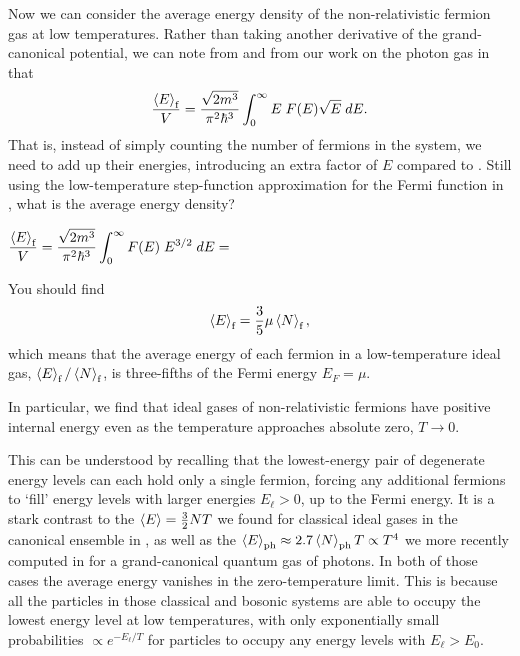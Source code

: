 Now we can consider the average energy density of the non-relativistic fermion gas at low temperatures.
Rather than taking another derivative of the grand-canonical potential, we can note from  and from our work on the photon gas in  that
\begin{equation}
  \frac{\left\langle E \right\rangle_{\text{f}}}{V} = \frac{\sqrt{2m^3}}{\pi^2 \hbar^3} \int_0^{\infty} E \; F(E) \sqrt{E} \; dE.
\end{equation}
That is, instead of simply counting the number of fermions in the system, we need to add up their energies, introducing an extra factor of $E$ compared to .
Still using the low-temperature step-function approximation for the Fermi function in , what is the average energy density?
\begin{mdframed}
  $\displaystyle \frac{\left\langle E \right\rangle_{\text{f}}}{V} = \frac{\sqrt{2m^3}}{\pi^2 \hbar^3} \int_0^{\infty} F(E) \; E^{3 / 2} \; dE = $ \\[100 pt]
\end{mdframed}
You should find
\begin{equation}
  \label{eq:fermi_E_N}
  \left\langle E \right\rangle_{\text{f}} = \frac{3}{5} \mu \left\langle N \right\rangle_{\text{f}},
\end{equation}
which means that the average energy of each fermion in a low-temperature ideal gas, $\left\langle E \right\rangle_{\text{f}} / \left\langle N \right\rangle_{\text{f}}$, is three-fifths of the Fermi energy $E_F = \mu$.

\begin{shaded}
  In particular, we find that ideal gases of non-relativistic fermions have positive internal energy even as the temperature approaches absolute zero, $T \to 0$.
\end{shaded}

This can be understood by recalling that the lowest-energy pair of degenerate energy levels can each hold only a single fermion, forcing any additional fermions to `fill' energy levels with larger energies $E_{\ell} > 0$, up to the Fermi energy.
It is a stark contrast to the $\left\langle E \right\rangle = \frac{3}{2} N T$ we found for classical ideal gases in the canonical ensemble in , as well as the $\left\langle E \right\rangle_{\text{ph}} \approx 2.7 \left\langle N \right\rangle_{\text{ph}} T \propto T^4$ we more recently computed in  for a grand-canonical quantum gas of photons.
In both of those cases the average energy vanishes in the zero-temperature limit.
This is because all the particles in those classical and bosonic systems are able to occupy the lowest energy level at low temperatures, with only exponentially small probabilities $\propto e^{-E_{\ell}/ T}$ for particles to occupy any energy levels with $E_{\ell} > E_0$.

